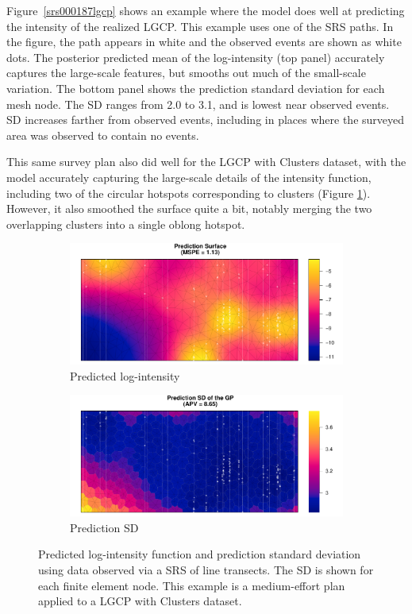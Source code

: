 \documentclass[review]{elsarticle}
\begin{document}
Figure~\ref{srs000187lgcp} shows an example where the model does well at
predicting the intensity of the realized LGCP. This example uses one of the
SRS paths. In the figure, the path appears in white and the observed events
are shown as white dots. The posterior predicted mean of the log-intensity
(top panel) accurately captures the large-scale features, but smooths out much
of the small-scale variation. The bottom panel shows the prediction standard
deviation for each mesh node. The SD ranges from 2.0 to 3.1, and is lowest
near observed events. SD increases farther from observed events, including
in places where the surveyed area was observed to contain no events.

This same survey plan also did well for the LGCP with Clusters dataset, with
the model accurately capturing the large-scale details of the intensity
function, including two of the circular hotspots corresponding to clusters
(Figure \ref{lambdasrs000187clust}). However, it also smoothed the surface
quite a bit, notably merging the two overlapping clusters into a single oblong
hotspot.

\begin{figure}

\begin{subfigure}{5in}
\includegraphics[width=5in]{../graphics/lambda-SRS000187-Cluster000004.pdf}
\caption{Predicted log-intensity}
\label{lambdasrs000187clust}
\end{subfigure}

\begin{subfigure}{5in}
\includegraphics[width=5in]{../graphics/lambdaSD-SRS000187-Cluster000004.pdf}
\caption{Prediction SD}
\label{sdsrs000187clust}
\end{subfigure}

\caption{Predicted log-intensity function and prediction standard deviation
using data observed via a SRS of line transects. The SD is shown for each
finite element node. This example is a medium-effort plan applied to a
LGCP with Clusters dataset.}
\label{srs000187clust}
\end{figure}
\end{document}

